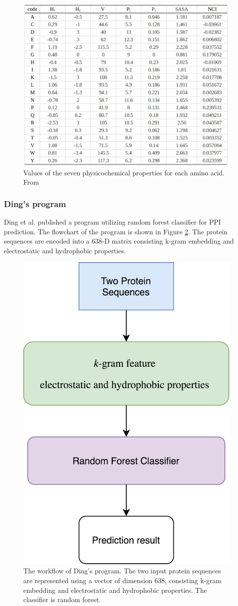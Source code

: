 \begin{figure}[h!]
\begin{center}
\includegraphics[height =12 cm, width = 12cm]{img/guo_ph_che.jpeg}
\caption{Values of the seven physicochemical properties for each amino acid. From \cite{Guo08_PPIpred} \label{fig:guo_ph_ch}}
\end{center}
\end{figure}

\subsubsection{Ding's program}
Ding et al. \cite{ding2016predicting} published a program utilizing random forest classifier for PPI prediction. The flowchart of the program is shown in Figure \ref{fig_Ding}. The protein sequences are encoded into a 638-D matrix consisting k-gram embedding and electrostatic and hydrophobic properties.
\begin{figure}[h!]
\begin{center}
\includegraphics[height =7 cm]{img/Ding.png}
\caption[The workflow of Ding's program]{The workflow of Ding's program. The two input protein sequences are represented using a vector of dimension 638, consisting k-gram embedding and electrostatic and hydrophobic properties. The classifier is random forest. \label{fig_Ding}}
\end{center}
\end{figure} 
